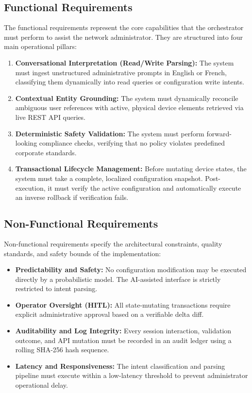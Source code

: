 \subsection{Functional Requirements}
The functional requirements represent the core capabilities that the orchestrator must perform to assist the network administrator. They are structured into four main operational pillars:
\begin{enumerate}
    \item \textbf{Conversational Interpretation (Read/Write Parsing):} The system must ingest unstructured administrative prompts in English or French, classifying them dynamically into read queries or configuration write intents.
    \item \textbf{Contextual Entity Grounding:} The system must dynamically reconcile ambiguous user references with active, physical device elements retrieved via live REST API queries.
    \item \textbf{Deterministic Safety Validation:} The system must perform forward-looking compliance checks, verifying that no policy violates predefined corporate standards.
    \item \textbf{Transactional Lifecycle Management:} Before mutating device states, the system must take a complete, localized configuration snapshot. Post-execution, it must verify the active configuration and automatically execute an inverse rollback if verification fails.
\end{enumerate}

\subsection{Non-Functional Requirements}
Non-functional requirements specify the architectural constraints, quality standards, and safety bounds of the implementation:
\begin{itemize}
    \item \textbf{Predictability and Safety:} No configuration modification may be executed directly by a probabilistic model. The AI-assisted interface is strictly restricted to intent parsing.
    \item \textbf{Operator Oversight (HITL):} All state-mutating transactions require explicit administrative approval based on a verifiable delta diff.
    \item \textbf{Auditability and Log Integrity:} Every session interaction, validation outcome, and API mutation must be recorded in an audit ledger using a rolling SHA-256 hash sequence.
    \item \textbf{Latency and Responsiveness:} The intent classification and parsing pipeline must execute within a low-latency threshold to prevent administrator operational delay.
\end{itemize}

